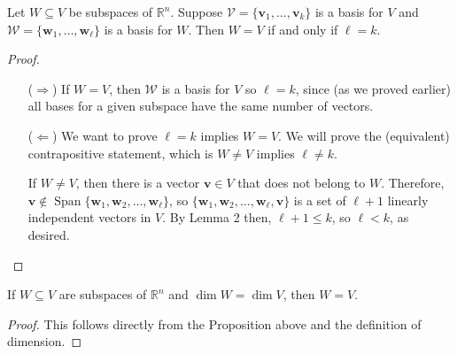 \documentclass{article}
\newcommand{\R}{\ensuremath{\mathbb{R}}}
\newcommand{\Span}{\ensuremath{\operatorname{Span}}}
\newcommand{\sV}{\ensuremath{\mathcal{V}}}
\newcommand{\sW}{\ensuremath{\mathcal{W}}}
\newcommand{\vw}{\ensuremath{\mathbf{w}}}
\newcommand{\vv}{\ensuremath{\mathbf{v}}}
\begin{document}
Let $W \subseteq V$ be subspaces of $\R^n$.
Suppose $\sV = \{\mathbf{v}_1,\dots, \mathbf{v}_k\}$ is a basis for
$V$ and $\sW = \{\mathbf{w}_1,\dots, \mathbf{w}_\ell\}$ is a basis for $W$.
Then $W = V$ if and only if $\ell = k$.

\begin{proof}\
  \begin{itemize}
  \item[($\Rightarrow$)]
  If $W = V$, then $\sW$ is a basis for $V$ so $\ell = k$, since (as we proved
  earlier) all bases for a given subspace have the same number of vectors.

  \item[($\Leftarrow$)] We want to prove $\ell=k$ implies $W = V$.
  We will prove the (equivalent) contrapositive statement, which is
  $W \neq V$ implies $\ell\neq k$.


  If $W \neq V$, then there is a vector $\vv \in V$ that does not belong to $W$.
  Therefore, $\vv \notin \Span \{\vw_1, \vw_2, \dots, \vw_\ell\}$, so
  $\{\vw_1, \vw_2, \dots, \vw_\ell, \vv\}$ is a set of $\ell + 1$ linearly independent
  vectors in $V$.  By Lemma 2 then, $\ell + 1 \leq k$, so $\ell < k$, as desired.
  
  \end{itemize}
\end{proof}

 If $W \subseteq V$ are subspaces of $\R^n$ and $\dim W = \dim V$, then $W = V$.

\begin{proof}
  This follows directly from the Proposition above and the definition of dimension.
\end{proof}
\end{document}
